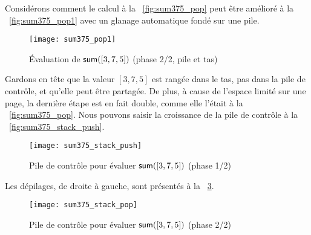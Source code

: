 Considérons comment le calcul à la \fig~\vref{fig:sum375_pop} peut
être amélioré à la \fig~\vref{fig:sum375_pop1} avec un glanage
automatique fondé sur une pile.
\begin{figure}[b]
\centering
\texttt{[image: sum375\_pop1]}
\caption{Évaluation de \(\textsf{sum}([3,7,5])\) (phase 2/2, pile et tas)
\label{fig:sum375_pop1}}
\end{figure}
Gardons en tête que la valeur \([3,7,5]\) est rangée dans le tas, pas
dans la pile de contrôle, et qu'elle peut être partagée. De plus, à
cause de l'espace limité sur une page, la dernière étape est en fait
double, comme elle l'était à la \fig~\vref{fig:sum375_pop}. Nous
pouvons saisir la croissance de la pile de contrôle à la
\fig~\vref{fig:sum375_stack_push}.
\begin{figure}
\centering
\texttt{[image: sum375\_stack\_push]}
\caption{Pile de contrôle pour évaluer \(\textsf{sum}([3,7,5])\) (phase
  1/2)
  \label{fig:sum375_stack_push}}
\end{figure}
Les dépilages, de droite à gauche, sont présentés à la
\fig~\ref{fig:sum375_stack_pop}.
\begin{figure}
\centering
\texttt{[image: sum375\_stack\_pop]}
\caption{Pile de contrôle pour évaluer \(\textsf{sum}([3,7,5])\)
(phase 2/2)
\label{fig:sum375_stack_pop}}
\end{figure}

